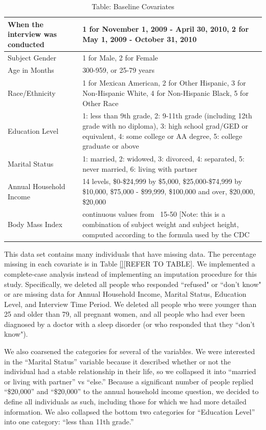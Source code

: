 \documentclass{article}
\begin{document}
\begin{table}
\caption{Table: Baseline Covariates}
\begin{tabular}{| p{3cm} | p{7cm} |}
\hline
When the interview was conducted & 1 for November 1, 2009 - April 30, 2010, 2 for May 1, 2009 - October 31, 2010\\
\hline
Subject Gender & 1 for Male, 2 for Female\\
\hline
Age in Months & 300-959, or 25-79 years\\
\hline
Race/Ethnicity & 1 for Mexican American, 2 for Other Hispanic, 3 for Non-Hispanic White, 4 for Non-Hispanic Black, 5 for Other Race\\
\hline
Education Level & 1: less than 9th grade, 2: 9-11th grade (including 12th grade with no diploma), 3: high school grad/GED or equivalent, 4: some college or AA degree, 5: college graduate or above\\
\hline
Marital Status & 1: married, 2: widowed, 3: divorced, 4: separated, 5: never married, 6: living with partner\\
\hline
Annual Household Income & 14 levels, \$0-\$24,999 by \$5,000, \$25,000-\$74,999 by \$10,000,  \$75,000 - \$99,999, \$100,000 and over, \$20,000, \$20,000\\
\hline
Body Mass Index & continuous values from ~15-50 [Note: this is a combination of subject weight and subject height, computed according to the formula used by the CDC \cite{bmi}\\
\hline
\end{tabular}
\end{table}


\vspace{0.5cm}

This data set contains many individuals that have missing data.  The percentage missing in each covariate is in Table \ref{}[REFER TO TABLE].  We implemented a complete-case analysis instead of implementing an imputation procedure for this study. Specifically, we deleted all people who responded ``refused" or ``don't know" or are missing data for Annual Household Income, Marital Status, Education Level, and Interview Time Period.  We deleted all people who were younger than 25 and older than 79, all pregnant women, and all people who had ever been diagnosed by a doctor with a sleep disorder (or who responded that they ``don't know").  

We also coarsened the categories for several of the variables.  We were interested in the ``Marital Status'' variable because it described whether or not the individual had a stable relationship in their life, so we collapsed it into ``married or living with partner'' vs ``else.''  Because a significant number of people replied ``\$20,000'' and ``\$20,000'' to the annual household income question, we decided to define all individuals as such, including those for which we had more detailed information.  We also collapsed the bottom two categories for ``Education Level'' into one category: ``less than 11th grade.''
\end{document}
